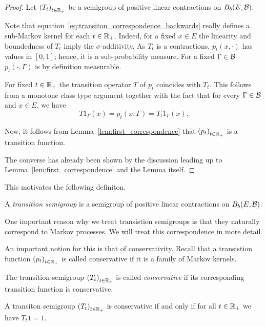 \documentclass[../Master.tex]{subfiles}
\begin{document}
\begin{proof}
  Let \({(T_t)}_{t \in \mathbb{R}_+}\) be a semigroup of positive linear contractions on \(B_b(E,\mathcal{B})\).
  
  Note that equation~\eqref{eq:transiton_correspondence_backwards} really defines a sub-Markov kernel for each \(t \in \mathbb{R}_+\). Indeed, for a fixed \(x \in E \) the linearity and boundedness of \(T_t\) imply the \(\sigma{}\)-additivity. As \(T_t\) is a contractions, \(p_t(x, \cdot)\) has values in \([0,1]\); hence, it is a sub-probability measure. For a fixed \(\Gamma \in \mathcal{B}\) \(p_t(\cdot, \Gamma)\) is by definition measurable.

  For fixed \(t \in \mathbb{R}_+\) the transition operator \(T\) of \(p_t\) coincides with \(T_t\). This follows from a monotone class type argument together with the fact that for every \(\Gamma \in \mathcal{B}\) and \(x \in E\), we have 
  \begin{equation}
    T1_\Gamma (x) = p_t(x, \Gamma) = T_t 1_\Gamma (x).
  \end{equation}

  Now, it follows from Lemma~\ref{lem:first_correspondence} that \({(p_t)}_{t \in \mathbb{R}_+}\) is a transition function.

  The converse has already been shown by the discussion leading up to Lemma~\ref{lem:first_correspondence} and the Lemma itself.
\end{proof}

This motivates the following definiton.
\begin{definition}
  A \emph{transition semigroup} is a semigroup of positive linear contractions on \(B_b(E, \mathcal{B})\).
\end{definition}

One important reason why we treat transistion semigroups is that they naturally correspond to Markov processes. We will treat this correspondence in more detail.

An important notion for this is that of conservativity. Recall that a transistion function \({(p_t)}_{t \in \mathbb{R}_+}\) is called conservative if it is a family of Markov kernels.

\begin{definition}
  The transition semigroup \({(T_t)}_{t \in \mathbb{R}_+}\) is called \emph{conservative} if its corresponding transition function is conservative.
\end{definition}

\begin{lemma}\label{lem:conservative}
  A transiton semigroup \({(T_t)}_{t \in \mathbb{R}_+}\) is conservative if and only if for all \(t \in \mathbb{R}_+\) we have \(T_t 1 = 1\).
\end{lemma}
\end{document}

